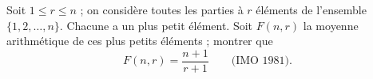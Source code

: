 Soit $1 \leq r \leq n$ ; on considère toutes les parties à $r$ éléments de l'ensemble $\{1, 2, \ldots, n\}$. Chacune a un plus petit élément. Soit $F(n, r)$ la moyenne arithmétique de ces plus petits éléments ; montrer que
\[ F(n, r) = \frac{n + 1}{r + 1} \qquad \text{(IMO 1981).} \]

